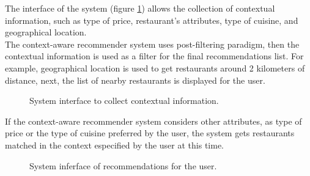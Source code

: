 The interface of the system (figure \ref{fig:context}) allows the collection 
of contextual information, such as type of price, restaurant's
attributes, type of cuisine, and geographical location. \\ 
The context-aware recommender system uses post-filtering paradigm, 
then the contextual information is used as a filter for the final 
recommendations list. For example, geographical location is used 
to get restaurants around 2 kilometers of distance, next, 
the list of nearby restaurants is displayed for the user.\\  
\begin{figure}
\captionsetup{justification=centering,margin=2cm,font=footnotesize}
\centering
{}
\caption{System interface to collect contextual information.}
\label{fig:context}   
\end{figure}
If the context-aware recommender system
considers other attributes, as type of price or the type of cuisine
preferred by the user, the system gets restaurants matched in the
context especified by the user at this time. 
\begin{figure}
\captionsetup{font=footnotesize}
\centering
{}
\caption{System inferface of recommendations for the user.}
\label{fig:recom}    
\end{figure}
